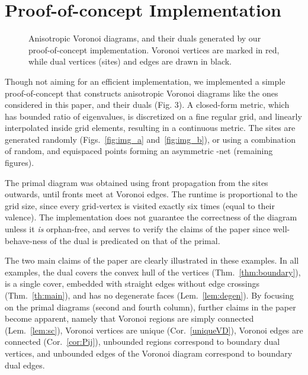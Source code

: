 \documentclass[11pt]{article}
\begin{document}
\section{Proof-of-concept Implementation}\label{sec:implementation}

\begin{figure}[ht]
\centering
{}
\quad
{}
\caption{
Anisotropic Voronoi diagrams, and their duals generated by our
proof-of-concept implementation. 
Voronoi vertices are marked in red, while dual vertices (sites) and edges are drawn
in black.}
\end{figure}



Though not aiming for an efficient implementation, 
we implemented a simple proof-of-concept that constructs anisotropic Voronoi diagrams
like the ones considered in this paper, and their duals
(Fig. 3). 
A closed-form metric, which has bounded ratio of eigenvalues, is discretized on a
fine regular grid, and linearly interpolated inside grid elements, resulting in a
continuous metric. The sites are generated randomly (Figs.~\ref{fig:img_a}
and~\ref{fig:img_b}), or using a combination of random, and equispaced
points forming an asymmetric -net (remaining figures). 

The primal diagram was obtained using front propagation from the sites
outwards, until fronts meet at Voronoi edges. 
The runtime is proportional to the grid size, since every grid-vertex is visited exactly six times (equal to their valence). 
The implementation does not guarantee the correctness of the diagram unless it \emph{is} orphan-free, and serves to verify the claims of the paper since well-behave-ness of the dual is predicated on that of the primal. 


The two main claims of the paper are clearly illustrated in these examples. 
In all examples, the dual covers the convex hull of the vertices
(Thm.~\ref{thm:boundary}), is a
single cover, embedded with straight edges without edge crossings
(Thm.~\ref{th:main}), 
and has no degenerate faces (Lem.~\ref{lem:degen}). 
By focusing on the primal diagrams (second and fourth column), further claims in
the paper become apparent, namely that Voronoi regions are simply connected (Lem.~\ref{lem:sc}), 
Voronoi vertices are unique (Cor.~\ref{uniqueVD}), 
Voronoi edges are connected (Cor.~\ref{cor:Pij}), 
unbounded regions correspond to boundary dual vertices, and unbounded
edges of the Voronoi diagram correspond to boundary dual edges.
\end{document}
